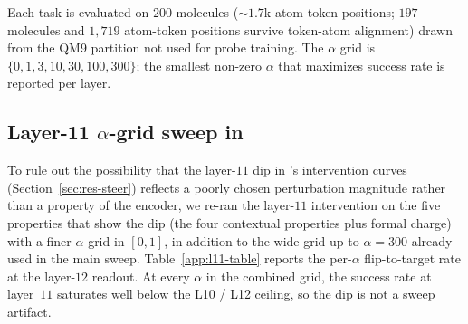  Each task is evaluated on $200$ molecules ($\sim 1.7$k atom-token positions; $197$ molecules and $1{,}719$ atom-token positions survive token-atom alignment) drawn from the QM9 partition not used for probe training. The $\alpha$ grid is $\{0, 1, 3, 10, 30, 100, 300\}$; the smallest non-zero $\alpha$ that maximizes success rate is reported per layer.

\subsection{Layer-11 \texorpdfstring{$\alpha$}{alpha}-grid sweep in \smi}

To rule out the possibility that the layer-$11$ dip in \smi's intervention curves (Section~\ref{sec:res-steer}) reflects a poorly chosen perturbation magnitude rather than a property of the encoder, we re-ran the layer-$11$ intervention on the five properties that show the dip (the four contextual properties plus formal charge) with a finer $\alpha$ grid in $[0, 1]$, in addition to the wide grid up to $\alpha = 300$ already used in the main sweep. Table~\ref{app:l11-table} reports the per-$\alpha$ flip-to-target rate at the layer-$12$ readout. At every $\alpha$ in the combined grid, the success rate at layer~$11$ saturates well below the L10 / L12 ceiling, so the dip is not a sweep artifact.

